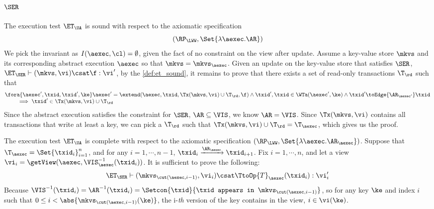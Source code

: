 



\subsection{ \( \SER \)}

The execution test $\ET_\UA$ is sound with respect to the axiomatic specification 
\[ 
    (\RP_{\LWW}, \Set{\lambda \aexec. \AR })
\]
We pick the invariant as \( I( \aexec, \cl ) = \emptyset \), given the fact of no constraint on the view after update.
Assume a key-value store \( \mkvs \) and its corresponding abstract execution \( \aexec \) so that \( \mkvs = \mkvs_\aexec \).
Given an update on the key-value store that satisfies \( \SER \), \ie \(\ET_\SER \vdash (\mkvs, \vi) \csat \f : \vi' \),
by the \cref{def:et_sound}, it remains to prove that there exists a set of read-only transactions \( \T_\rd \) such that
\[
    \begin{array}{@{}l@{}}
        \fora{ \aexec', \txid, \txid', \ke } 
        \aexec' = \extend(\aexec, \txid, \Tx(\mkvs, \vi) \cup \T_\rd, \f ) 
        \land \txid', \txid \in \WTa(\aexec', \ke) \land  \txid' \toEdge{\AR_{\aexec'}} \txid  \\
        \qquad {} \implies \txid' \in \Tx(\mkvs, \vi) \cup \T_\rd
    \end{array}
\]
Since the abstract execution satisfies the constraint for \( \SER \), \ie \( \AR \subseteq \VIS \), we know \( \AR = \VIS \).
Since \( \Tx(\mkvs, \vi)  \) contains all transactions that write at least a key, 
we can pick a \( \T_\rd \) such that \( \Tx(\mkvs, \vi) \cup \T_\rd = \T_\aexec\),
which gives us the proof.

The execution test $\ET_\UA$ is complete with respect to the axiomatic specification \( (\RP_{\LWW}, \Set{\lambda \aexec. \AR_\aexec }) \).
Suppose that $\T_{\aexec} = \Set{\txid_{i}}_{i=1}^{n}$, and for any $i=1,\cdots, n-1$,
$\txid_{i} \xrightarrow{\AR_{\aexec}} \txid_{i+1}$.
Fix $i=1,\cdots,n$, and let a view $\vi_{i} = \getView(\aexec, \VIS^{-1}_{\aexec}(\txid_{i}))$.
It is sufficient to prove the following:
\[
    \ET_\SER \vdash ( \mkvs_{\cut(\aexec, i-1)}, \vi_i ) \csat \TtoOp{T}_{\aexec}(\txid_{i}) : \vi'_{i}
\]
Because \( \VIS^{-1}(\txid_i) = \AR^{-1}(\txid_i) = \Setcon{\txid }{\txid \texttt{ appears in } \mkvs_{\cut(\aexec, i-1)} }\),
so for any key \( \ke \) and index \( i \) such that \( 0 \leq i < \abs{\mkvs_{\cut(\aexec, i-1)}(\ke)} \),
the i-\emph{th} version of the key contains in the view, \ie \( i \in \vi(\ke)\).

